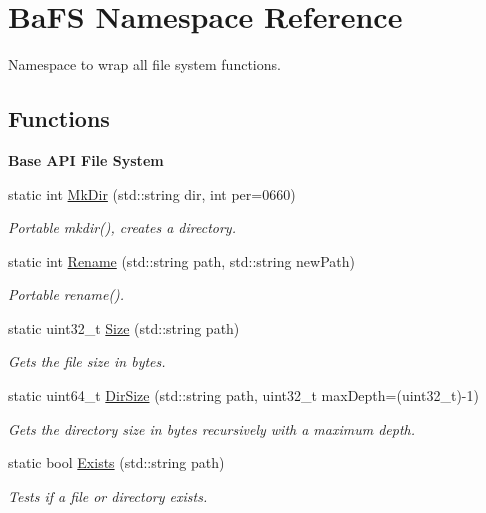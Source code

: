 \hypertarget{namespaceBaFS}{}\section{Ba\+F\+S Namespace Reference}
\label{namespaceBaFS}


Namespace to wrap all file system functions.  


\subsection*{Functions}
\begin{Indent}{\bf Base A\+P\+I File System}\par
\begin{DoxyCompactItemize}
\item 
static int \hyperlink{namespaceBaFS_a9e6346a9784d4de1dbda3c79ef8bb72b}{Mk\+Dir} (std\+::string dir, int per=0660)
\begin{DoxyCompactList}\small\item\em Portable mkdir(), creates a directory. \end{DoxyCompactList}\item 
static int \hyperlink{namespaceBaFS_ad729f83dfe589df3058696c6db6452c9}{Rename} (std\+::string path, std\+::string new\+Path)
\begin{DoxyCompactList}\small\item\em Portable rename(). \end{DoxyCompactList}\item 
static uint32\+\_\+t \hyperlink{namespaceBaFS_a526ea62172fcaa4003dd437863c6604c}{Size} (std\+::string path)
\begin{DoxyCompactList}\small\item\em Gets the file size in bytes. \end{DoxyCompactList}\item 
static uint64\+\_\+t \hyperlink{namespaceBaFS_aafa79b524a4f13b6531cf79b1f73774e}{Dir\+Size} (std\+::string path, uint32\+\_\+t max\+Depth=(uint32\+\_\+t)-\/1)
\begin{DoxyCompactList}\small\item\em Gets the directory size in bytes recursively with a maximum depth. \end{DoxyCompactList}\item 
static bool \hyperlink{namespaceBaFS_a73d165c90a00491cfe0b9ce3b5fe5c58}{Exists} (std\+::string path)
\begin{DoxyCompactList}\small\item\em Tests if a file or directory exists. \end{DoxyCompactList}\end{DoxyCompactItemize}
\end{Indent}


